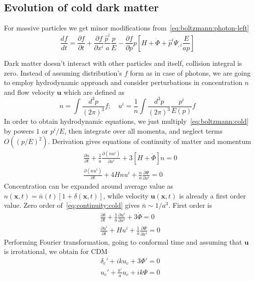 \documentclass[12pt]{extarticle}
\numberwithin{problem}{section}
\numberwithin{theorem}{section}
\begin{document}
	\subsection{Evolution of cold dark matter}
	For massive particles we get minor modifications from~\ref{eq:boltzmann:photon-left}
	\begin{equation}
		\label{eq:boltzmann:cold}
		\frac{df}{dt} = \frac{\partial f}{\partial t} + \frac{\partial f}{\partial x^i}\frac{\hat{p}^i}{a}\frac{p}{E} - \frac{\partial f}{\partial p}p\left[H + \dot{\Phi} + \hat{p}^i\Psi_{,i} \frac{E}{ap}\right]
	\end{equation}
	
	Dark matter doesn't interact with other particles and itself, collision integral is zero. Instead of assuming distribution's $f$ form as in case of photons, we are going to employ hydrodynamic approach and consider perturbations in concentration $n$ and flow velocity $\mathbf{u}$ which are defined as
	\begin{equation}
		n = \int\frac{d^3p}{(2\pi)^3} f;\quad u^i = \frac{1}{n}\int\frac{d^3p}{(2\pi)^3} \frac{p^i}{E(p)}f
	\end{equation}
	In order to obtain hydrodynamic equations, we just multiply~\ref{eq:boltzmann:cold} by powers $1$ or $p^i/E$, then integrate over all momenta, and neglect terms $O((p/E)^2)$. Derivation gives equations of continuity of matter and momentum
	\begin{align}
		\label{eq:continuity:cold}
		& \frac{\partial n}{\partial t} + \frac{1}{a}\frac{\partial (nu^i)}{\partial x^i} + 3[H + \dot{\Phi}]n = 0\\
		\label{eq:momentum:cold}
		& \frac{\partial(nu^i)}{\partial t} + 4Hnu^i + \frac{n}{a}\frac{\partial \Psi}{\partial x^i} = 0
	\end{align}
	Concentration can be expanded around average value as $n(\mathbf{x}, t) = \bar{n}(t)[1 + \delta(\mathbf{x}, t)]$, while velocity $\mathbf{u}(\mathbf{x}, t)$ is already a first order value. Zero order of~\ref{eq:continuity:cold} gives $\bar{n}\sim 1/a^3$. First order is
	\begin{align}
		& \frac{\partial\delta}{\partial t} + \frac{1}{a}\frac{\partial u^i}{\partial x^i} + 3\dot{\Phi} = 0 \\
		& \frac{\partial u^i}{\partial t} + Hu^i + \frac{1}{a}\frac{\partial\Psi}{\partial x^i} = 0
	\end{align}
	Performing Fourier transformation, going to conformal time and assuming that $\mathbf{u}$ is irrotational, we obtain for CDM
	\begin{align}
		\label{eq:density:cold}
		& \delta_c' + iku_c + 3\Phi' = 0\\
		& u_c' + \frac{a'}{a}u_c + ik\Psi = 0
	\end{align}
\end{document}

